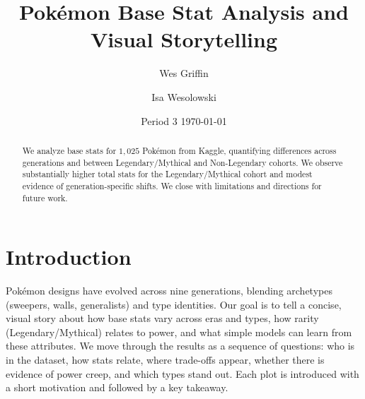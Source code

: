 \documentclass[11pt]{article}
\title{Pokémon Base Stat Analysis and Visual Storytelling}
\author{Wes Griffin \and Isa Wesolowski}
\date{Period 3 \quad \today}
\begin{document}
\maketitle

\begin{abstract}
We analyze base stats for \(1{,}025\) Pokémon from Kaggle, quantifying differences across generations and between Legendary/Mythical and Non-Legendary cohorts. We observe substantially higher total stats for the Legendary/Mythical cohort and modest evidence of generation-specific shifts. We close with limitations and directions for future work.
\end{abstract}

\section*{Introduction}
Pokémon designs have evolved across nine generations, blending archetypes (sweepers, walls, generalists) and type identities. Our goal is to tell a concise, visual story about how base stats vary across eras and types, how rarity (Legendary/Mythical) relates to power, and what simple models can learn from these attributes. We move through the results as a sequence of questions: who is in the dataset, how stats relate, where trade-offs appear, whether there is evidence of power creep, and which types stand out. Each plot is introduced with a short motivation and followed by a key takeaway.
\end{document}
